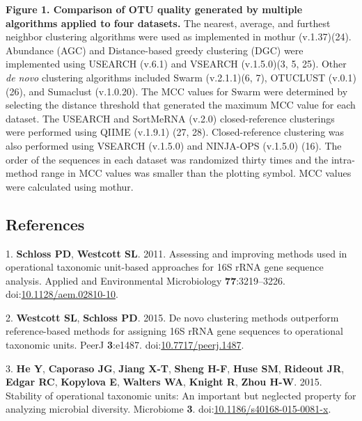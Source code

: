 \documentclass[11pt,]{article}
\begin{document}
\newpage

\textbf{Figure 1. Comparison of OTU quality generated by multiple
algorithms applied to four datasets.} The nearest, average, and furthest
neighbor clustering algorithms were used as implemented in mothur
(v.1.37)(24). Abundance (AGC) and Distance-based greedy clustering (DGC)
were implemented using USEARCH (v.6.1) and VSEARCH (v.1.5.0)(3, 5, 25).
Other \emph{de novo} clustering algorithms included Swarm (v.2.1.1)(6,
7), OTUCLUST (v.0.1)(26), and Sumaclust (v.1.0.20). The MCC values for
Swarm were determined by selecting the distance threshold that generated
the maximum MCC value for each dataset. The USEARCH and SortMeRNA
(v.2.0) closed-reference clusterings were performed using QIIME
(v.1.9.1) (27, 28). Closed-reference clustering was also performed using
VSEARCH (v.1.5.0) and NINJA-OPS (v.1.5.0) (16). The order of the
sequences in each dataset was randomized thirty times and the
intra-method range in MCC values was smaller than the plotting symbol.
MCC values were calculated using mothur.

\newpage

\subsection*{References}\label{references}

\hypertarget{refs}{}
\hypertarget{ref-Schloss2011Assessing}{}
1. \textbf{Schloss PD}, \textbf{Westcott SL}. 2011. Assessing and
improving methods used in operational taxonomic unit-based approaches
for 16S rRNA gene sequence analysis. Applied and Environmental
Microbiology \textbf{77}:3219--3226.
doi:\href{https://doi.org/10.1128/aem.02810-10}{10.1128/aem.02810-10}.

\hypertarget{ref-Westcott2015}{}
2. \textbf{Westcott SL}, \textbf{Schloss PD}. 2015. De novo clustering
methods outperform reference-based methods for assigning 16S rRNA gene
sequences to operational taxonomic units. PeerJ \textbf{3}:e1487.
doi:\href{https://doi.org/10.7717/peerj.1487}{10.7717/peerj.1487}.

\hypertarget{ref-He2015}{}
3. \textbf{He Y}, \textbf{Caporaso JG}, \textbf{Jiang X-T},
\textbf{Sheng H-F}, \textbf{Huse SM}, \textbf{Rideout JR}, \textbf{Edgar
RC}, \textbf{Kopylova E}, \textbf{Walters WA}, \textbf{Knight R},
\textbf{Zhou H-W}. 2015. Stability of operational taxonomic units: An
important but neglected property for analyzing microbial diversity.
Microbiome \textbf{3}.
doi:\href{https://doi.org/10.1186/s40168-015-0081-x}{10.1186/s40168-015-0081-x}.
\end{document}

